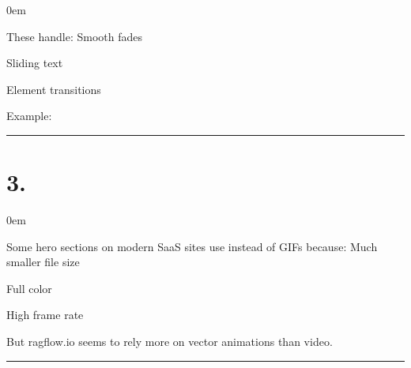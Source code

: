 \documentclass[letterpaper,10pt,english]{sphinxmanual}
\begin{document}
\begin{DUlineblock}{0em}
\item[] These handle: \sphinxhyphen{} Smooth fades
\item[] \sphinxhyphen{} Sliding text
\item[] \sphinxhyphen{} Element transitions
\end{DUlineblock}

\sphinxAtStartPar
Example:

\begin{sphinxVerbatim}[commandchars=\\\{\}]

\end{sphinxVerbatim}


\bigskip\hrule\bigskip



\section{3. }
\label{\detokenize{web-design:webm-mp4-looping-videos-sometimes-used}}
\begin{DUlineblock}{0em}
\item[] Some hero sections on modern SaaS sites use 
instead of GIFs because: \sphinxhyphen{} Much smaller file size
\item[] \sphinxhyphen{} Full color
\item[] \sphinxhyphen{} High frame rate
\end{DUlineblock}

\sphinxAtStartPar
But ragflow.io seems to rely more on vector animations than video.


\bigskip\hrule\bigskip
\end{document}
